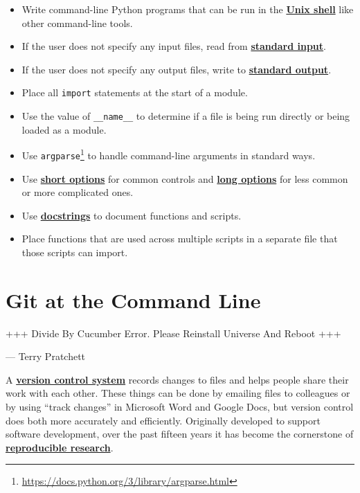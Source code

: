 \documentclass[
]{krantz}
\providecommand{\tightlist}{%
  \setlength{\itemsep}{0pt}\setlength{\parskip}{0pt}}
\renewenvironment{quote}{\begin{VF}}{\end{VF}}
\renewcommand{\href}[2]{#2\footnote{\url{#1}}}
\newcommand{\gref}[2]{\hyperlink{#2}{\textbf{#1}}}
\begin{document}
\begin{itemize}
\tightlist
\item
  Write command-line Python programs that can be run in the \gref{Unix shell}{shell} like other command-line tools.
\item
  If the user does not specify any input files, read from \gref{standard input}{stdin}.
\item
  If the user does not specify any output files, write to \gref{standard output}{stdout}.
\item
  Place all \texttt{import} statements at the start of a module.
\item
  Use the value of \texttt{\_\_name\_\_} to determine if a file is being run directly or being loaded as a module.
\item
  Use \href{https://docs.python.org/3/library/argparse.html}{\texttt{argparse}} to handle command-line arguments in standard ways.
\item
  Use \gref{short options}{short\_option} for common controls and \gref{long options}{long\_option} for less common or more complicated ones.
\item
  Use \gref{docstrings}{docstring} to document functions and scripts.
\item
  Place functions that are used across multiple scripts in a separate file that those scripts can import.
\end{itemize}

\hypertarget{git-cmdline}{%
\chapter{Git at the Command Line}\label{git-cmdline}}

\begin{quote}
+++ Divide By Cucumber Error. Please Reinstall Universe And Reboot +++

--- Terry Pratchett
\end{quote}

A \gref{version control system}{version\_control\_system} records changes to files
and helps people share their work with each other.
These things can be done by emailing files to colleagues
or by using ``track changes'' in Microsoft Word and Google Docs,
but version control does both more accurately and efficiently.
Originally developed to support software development,
over the past fifteen years it has become the cornerstone
of \gref{reproducible research}{reproducible\_research}.
\end{document}
